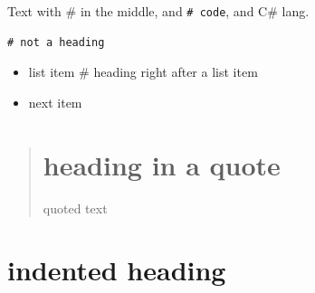 Text with \# in the middle, and \texttt{# code}, and C\# lang.

\begin{listing}[H]
\begin{verbatim}
# not a heading
\end{verbatim}
\end{listing}

\begin{itemize}
\item list item \# heading right after a list item
\item next item 
\end{itemize}

\begin{quotation}
\section*{heading in a quote}

  quoted text
\end{quotation}
\section*{indented heading}


